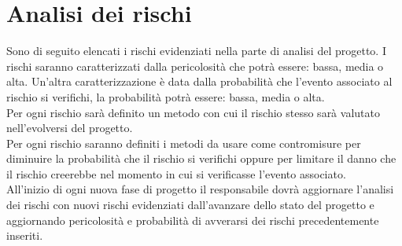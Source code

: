 \section{Analisi dei rischi}{
Sono di seguito elencati i rischi evidenziati nella parte di analisi del progetto. 
I rischi saranno caratterizzati dalla pericolosità che potrà essere: bassa, media o alta.
Un'altra caratterizzazione è data dalla probabilità che l'evento associato al rischio si verifichi, la probabilità potrà essere: bassa, media o alta.\\
Per ogni rischio sarà definito un metodo con cui il rischio stesso sarà valutato nell'evolversi del progetto.\\
Per ogni rischio saranno definiti i metodi da usare come contromisure per diminuire la probabilità che il rischio si verifichi oppure per limitare il danno che il rischio creerebbe nel momento in cui si verificasse l'evento associato.\\
All'inizio di ogni nuova fase di progetto il responsabile dovrà aggiornare l'analisi dei rischi con nuovi rischi evidenziati dall'avanzare dello stato del progetto e aggiornando pericolosità e probabilità di avverarsi dei rischi precedentemente inseriti.

}
